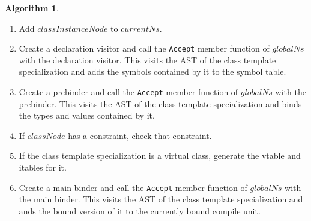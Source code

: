 \documentclass[a4paper,oneside,11pt]{book}
\theoremstyle{definition}
\newtheorem{algo}{Algorithm}[section]
\begin{document}
\begin{algo}
\begin{enumerate}
\begin{enumerate}
\item
Otherwise,
\begin{enumerate}
\item
If $i \ge $ number of template parameter nodes contained by $node$, report error "too few template arguments" and exit.
\item
Let $templateParameterNode$ be the $i$'th template parameter nodes of $classNode$.
\item
Let $defaultTemplateArgumentNode$ be the default template argument of $templateParameterNode$.
\item
If $defaultTemplateArgumentNode$ is null, report error "too few template arguments" and exit.
\item
Set $typeArgument$ to the type resolved using algorithm \ref{resolvetype} with\\
$defaultTemplateArgumentNode$.
\item
Add $typeArgument$ to the type arguments of the class template specialization symbol.
\end{enumerate}
\item
Set type of $boundTypeParam$ to $typeArgument$.
\item
Add $boundTypeParam$ as the member of the class template specialization symbol
so that it is found by the type resolver when binding the class template specialization.
The $boundTypeParam$ will map a name of a template parameter to the corresponding template argument symbol.
\end{enumerate}
\item
Add $classInstanceNode$ to $currentNs$.
\item
Create a declaration visitor and call the \verb|Accept| member function of $globalNs$ with the declaration visitor.
This visits the AST of the class template specialization and adds the symbols contained by it to the symbol table.
\item
Create a prebinder and call the \verb|Accept| member function of $globalNs$ with the prebinder.
This visits the AST of the class template specialization and binds the types and values contained by it.
\item
If $classNode$ has a constraint, check that constraint.
\item
If the class template specialization is a virtual class, generate the vtable and itables for it.
\item
Create a main binder and call the \verb|Accept| member function of $globalNs$ with the main binder.
This visits the AST of the class template specialization and ands the bound version of it to the currently bound compile unit.
\end{enumerate}
\end{algo}
\end{document}
